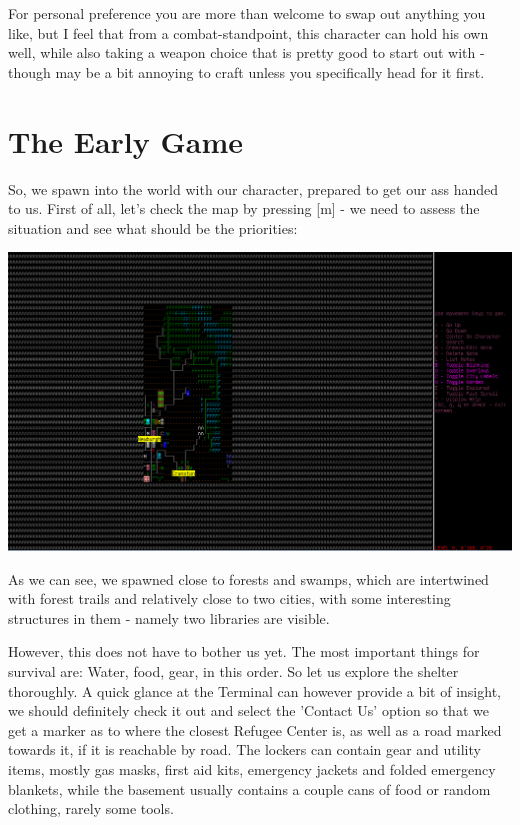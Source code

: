 \documentclass[11pt]{report}
\begin{document}
For personal preference you are more than welcome to swap out anything you like, but I feel that from a combat-standpoint, this character can hold his own well, while also taking a weapon choice that is pretty good to start out with - though may be a bit annoying to craft unless you specifically head for it first.


\section{The Early Game}

So, we spawn into the world with our character, prepared to get our ass handed to us. First of all, let's check the map by pressing [m] - we need to assess the situation and see what should be the priorities:

\includegraphics[width=\textwidth]{07}

As we can see, we spawned close to forests and swamps, which are intertwined with forest trails and relatively close to two cities, with some interesting structures in them - namely two libraries are visible.

However, this does not have to bother us yet. The most important things for survival are:
Water,
food,
gear,
in this order. So let us explore the shelter thoroughly.
A quick glance at the Terminal can however provide a bit of insight, we should definitely check it out and select the 'Contact Us' option so that we get a marker as to where the closest Refugee Center is, as well as a road marked towards it, if it is reachable by road.
The lockers can contain gear and utility items, mostly gas masks, first aid kits, emergency jackets and folded emergency blankets, while the basement usually contains a couple cans of food or random clothing, rarely some tools.
\end{document}
